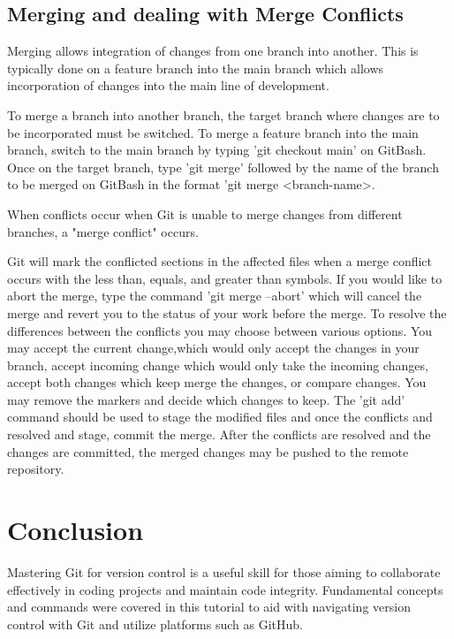 \documentclass[10pt,twocolumn]{article}
\begin{document}
\subsection {Merging and dealing with Merge Conflicts}
Merging allows integration of changes from one branch into another. This is typically done on a feature branch into the main branch which allows incorporation of changes into the main line of development. 

To merge a branch into another branch, the target branch where changes are to be incorporated must be switched. To merge a feature branch into the main branch, switch to the main branch by typing 'git checkout main' on GitBash. Once on the target branch, type 'git merge' followed by the name of the branch to be merged on GitBash in the format 'git merge <branch-name>.

When conflicts occur when Git is unable to merge changes from different branches, a "merge conflict" occurs.

Git will mark the conflicted sections in the affected files when a merge conflict occurs with the less than, equals, and greater than symbols. If you would like to abort the merge, type the command 'git merge --abort' which will cancel the merge and revert you to the status of your work before the merge.  To resolve the differences between the conflicts you may choose between various options. You may accept the current change,which would only accept the changes in your branch, accept incoming change which would only take the incoming changes, accept both changes which keep merge the changes, or compare changes. You may remove the markers and decide which changes to keep. The 'git add' command should be used to stage the modified files and once the conflicts and resolved and stage, commit the merge. After the conflicts are resolved and the changes are committed, the merged changes may be pushed to the remote repository. 
\section{Conclusion}
Mastering Git for version control is a useful skill for those aiming to collaborate effectively in coding projects and maintain code integrity. Fundamental concepts and commands were covered in this tutorial to aid with navigating version control with Git and utilize platforms such as GitHub. 
\end{document}
